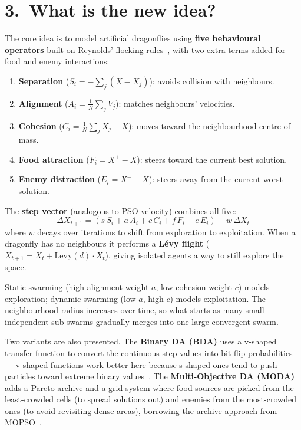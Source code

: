 \documentclass[11pt,a4paper]{article}
\begin{document}
\bigskip

\section*{3.\ What is the new idea?}

The core idea is to model artificial dragonflies using \textbf{five behavioural operators} built on Reynolds' flocking rules~\cite{reynolds1987flocks}, with two extra terms added for food and enemy interactions:

\begin{enumerate}
    \item \textbf{Separation} ($S_i = -\sum_j (X - X_j)$): avoids collision with neighbours.
    \item \textbf{Alignment} ($A_i = \frac{1}{N}\sum_j V_j$): matches neighbours' velocities.
    \item \textbf{Cohesion} ($C_i = \frac{1}{N}\sum_j X_j - X$): moves toward the neighbourhood centre of mass.
    \item \textbf{Food attraction} ($F_i = X^+ - X$): steers toward the current best solution.
    \item \textbf{Enemy distraction} ($E_i = X^- + X$): steers away from the current worst solution.
\end{enumerate}

The \textbf{step vector} (analogous to PSO velocity) combines all five:
\[
    \Delta X_{t+1} = (s\,S_i + a\,A_i + c\,C_i + f\,F_i + e\,E_i) + w\,\Delta X_t
\]
where $w$ decays over iterations to shift from exploration to exploitation.
When a dragonfly has no neighbours it performs a \textbf{Lévy flight} ($X_{t+1} = X_t + \text{Levy}(d)\cdot X_t$), giving isolated agents a way to still explore the space.

Static swarming (high alignment weight $a$, low cohesion weight $c$) models exploration; dynamic swarming (low $a$, high $c$) models exploitation.
The neighbourhood radius increases over time, so what starts as many small independent sub-swarms gradually merges into one large convergent swarm.

Two variants are also presented.
The \textbf{Binary DA (BDA)} uses a v-shaped transfer function to convert the continuous step values into bit-flip probabilities --- v-shaped functions work better here because s-shaped ones tend to push particles toward extreme binary values~\cite{saremi2014transfer}.
The \textbf{Multi-Objective DA (MODA)} adds a Pareto archive and a grid system where food sources are picked from the least-crowded cells (to spread solutions out) and enemies from the most-crowded ones (to avoid revisiting dense areas), borrowing the archive approach from MOPSO~\cite{coello2004mopso}.
\end{document}
